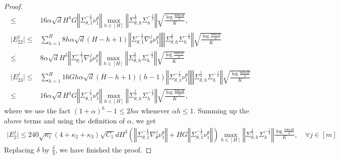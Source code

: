 \documentclass{article}
\numberwithin{equation}{section}
\begin{document}
\begin{proof}
\begin{align*}
    \leq&16\alpha\sqrt{d}H^4G\left\Vert\Sigma_{\theta,1}^{-\frac{1}{2}}\nu^\theta_1\right\Vert\max_{h\in[H]}\left\Vert\Sigma_{\theta,h}^{\frac{1}{2}}\Sigma_h^{-\frac{1}{2}}\right\Vert\sqrt{\frac{\log\frac{8dmH}{\delta}}{K}},\\
    \vert E_{22}^j\vert\leq&\sum_{h=1}^H8h\alpha\sqrt{d}(H-h+1)\left\Vert\Sigma_{\theta,1}^{-\frac{1}{2}}\nabla_\theta^j\nu^\theta_1\right\Vert\left\Vert\Sigma_{\theta,h}^{\frac{1}{2}}\Sigma_h^{-\frac{1}{2}}\right\Vert\sqrt{\frac{\log\frac{8dmH}{\delta}}{K}}\\
    \leq &8\alpha\sqrt{d}H^3\left\Vert\Sigma_{\theta,1}^{-\frac{1}{2}}\nabla_\theta^j\nu^\theta_1\right\Vert\max_{h\in[H]}\left\Vert\Sigma_{\theta,h}^{\frac{1}{2}}\Sigma_h^{-\frac{1}{2}}\right\Vert\sqrt{\frac{\log\frac{8dmH}{\delta}}{K}}\\
    \vert E_{23}^j\vert\leq&\sum_{h=1}^H16Gh\alpha\sqrt{d}(H-h+1)(h-1)\left\Vert\Sigma_{\theta,1}^{-\frac{1}{2}}\nu^\theta_1\right\Vert\left\Vert\Sigma_{\theta,h}^{\frac{1}{2}}\Sigma_h^{-\frac{1}{2}}\right\Vert\sqrt{\frac{\log\frac{8dmH}{\delta}}{K}}\\
    \leq&16\alpha\sqrt{d}H^4G\left\Vert\Sigma_{\theta,1}^{-\frac{1}{2}}\nu^\theta_1\right\Vert\max_{h\in[H]}\left\Vert\Sigma_{\theta,h}^{\frac{1}{2}}\Sigma_h^{-\frac{1}{2}}\right\Vert\sqrt{\frac{\log\frac{8dmH}{\delta}}{K}},
\end{align*}
where we use the fact $(1+\alpha)^h-1\leq 2h\alpha$ whenever $\alpha h\leq 1$.  Summing up the above terms and using the definition of $\alpha$, we get
\begin{align*}
    \vert E_2^j\vert\leq 240\sqrt{\kappa_1}(4+\kappa_2+\kappa_3)\sqrt{C_1}dH^3\left(\left\Vert\Sigma_{\theta,1}^{-\frac{1}{2}}\nabla_\theta^j\nu^\theta_1\right\Vert+HG\left\Vert\Sigma_{\theta,1}^{-\frac{1}{2}}\nu^\theta_1\right\Vert\right)\max_{h\in[H]}\left\Vert\Sigma_{\theta,h}^{\frac{1}{2}}\Sigma_h^{-\frac{1}{2}}\right\Vert\frac{\log\frac{8dmH}{\delta}}{K},\quad\forall j\in[m]
\end{align*}
Replacing $\delta$ by $\frac{\delta}{3}$, we have finished the proof. 
\end{proof}
\end{document}
